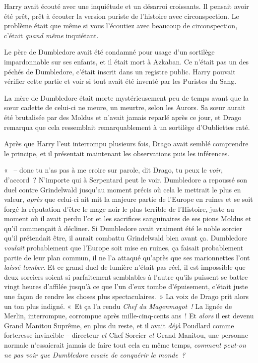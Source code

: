 \later

Harry avait écouté avec une inquiétude et un désarroi croissants.
Il pensait avoir été prêt, prêt à écouter la version puriste de l'histoire avec circonspection.
Le problème était que même si vous l'écoutiez avec beaucoup de circonspection, c'était \emph{quand même} inquiétant.

Le père de Dumbledore avait été condamné pour usage d'un sortilège impardonnable sur ses enfants, et il était mort à Azkaban.
Ce n'était pas un des péchés de Dumbledore, c'était inscrit dans un registre public.
Harry pouvait vérifier cette partie et voir si tout avait été inventé par les Puristes du Sang.

La mère de Dumbledore était morte mystérieusement peu de temps avant que la sœur cadette de celui-ci ne meure, un meurtre, selon les Aurors.
Sa sœur aurait été brutalisée par des Moldus et n'avait jamais reparlé après ce jour, et Drago remarqua que cela ressemblait remarquablement à un sortilège d'Oubliettes raté.

Après que Harry l'eut interrompu plusieurs fois, Drago avait semblé comprendre le principe, et il présentait maintenant les observations puis les inférences.

«~ -- donc tu n'as pas à me croire sur parole, dit Drago, tu peux le \emph{voir}, d'accord~?
N'importe qui à Serpentard peut le voir.
Dumbledore a repoussé son duel contre Grindelwald jusqu'au moment précis où cela le mettrait le plus en valeur, \emph{après} que celui-ci ait mit la majeure partie de l'Europe en ruines et se soit forgé la réputation d'être le mage noir le plus terrible de l'Histoire, juste au moment où il avait perdu l'or et les sacrifices sanguinaires de ses pions Moldus et qu'il commençait à décliner.
Si Dumbledore avait vraiment été le noble sorcier qu'il prétendait être, il aurait combattu Grindelwald bien avant ça.
Dumbledore \emph{voulait} probablement que l'Europe soit mise en ruines, ça faisait probablement partie de leur plan commun, il ne l'a attaqué qu'après que ses marionnettes l'ont \emph{laissé tomber}.
Et ce grand duel de lumière n'était pas réel, il est impossible que deux sorciers soient si parfaitement semblables à l'autre qu'ils puissent se battre vingt heures d'affilée jusqu'à ce que l'un d'eux tombe d'épuisement, c'était juste une façon de rendre les choses plus spectaculaires.~»
La voix de Drago prit alors un ton plus indigné.
«~Et ça l'a rendu \emph{Chef du Magenmagot~!} La lignée de Merlin, interrompue, corrompue après mille-cinq-cents ans~!
Et \emph{alors} il est devenu Grand Manitou Suprême, en plus du reste, et il avait \emph{déjà} Poudlard comme forteresse invincible -- directeur \emph{et} Chef Sorcier \emph{et} Grand Manitou, une personne normale n'essaierait jamais de faire tout cela en même temps, \emph{comment peut-on ne pas voir que Dumbledore essaie de conquérir le monde~?}

